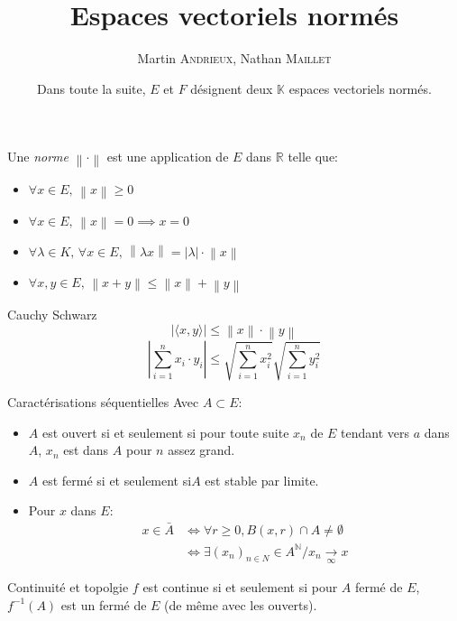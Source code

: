 \documentclass[french, a4paper, 11pt, twocolumn]{article}
\title{Espaces vectoriels normés}
\author{Martin \textsc{Andrieux}, Nathan \textsc{Maillet}}
\date{Dans toute la suite, \(E\) et \(F\) désignent deux \(\mathbb{K}\) espaces vectoriels normés.}
\newcommand{\ssi}{si et seulement si\xspace}		%
\newcommand{\norme}[1]{\left\| #1\right\|}
\newcommand{\abs}[1]{\left\lvert #1\right\rvert}
\newcommand{\limit}[1]{\underset{#1}{\rightarrow}}  %
\newcommand{\N}{\mathbb{N}}   %
\newcommand{\R}{\mathbb{R}}   %
\begin{document}
\maketitle

\begin{definition}
  Une \emph{norme} \(\norme{\cdot}\) est une application de \(E\) dans \(\R\) telle que:
  \begin{itemize}[label=\(\bullet\)]
    \item \(\forall x\in E,\,\norme{x}\geqslant 0\)
    \item \(\forall x\in E,\,\norme{x}=0\implies x=0\)
    \item \(\forall\lambda\in K,\,\forall x\in E,\, \norme{\lambda x}=\abs{\lambda} \cdot \norme{x}\)
    \item \(\forall x,y\in E,\, \norme{x+y}\leqslant\norme{x}+\norme{y}\)
  \end{itemize}
\end{definition}

\begin{theoreme}{Cauchy Schwarz}
  \[\left\lvert \langle x,y\rangle\right\rvert\leqslant\norme{x}\cdot\norme{y}\]
  \tcblower
  \[\abs{\sum_{i=1}^n x_{i}\cdot y_{i}}\leqslant \sqrt{\sum_{i=1}^n x_{i}^{2}}\sqrt{\sum_{i=1}^n y_{i}^{2}}\]
\end{theoreme}

\begin{theoreme}{Caractérisations séquentielles}
    Avec \(A \subset E\):
    \begin{itemize}[label=\(\bullet\)]
        \item \(A\) est ouvert \ssi pour toute suite \(x_{n}\) de \(E\) tendant vers \(a\) dans \(A\), \(x_{n}\) est dans \(A\) pour \(n\) assez grand.
        \item \(A\) est fermé \ssi \(A\) est stable par limite.
        \item Pour \(x\) dans \(E\):
        \begin{align*} 
            x \in \bar{A} & \iff \forall r \geq 0, B(x,r) \cap A \neq \emptyset \\
                          & \iff \exists {(x_n)}_{n\in N} \in A^{\N} / x_n \limit{\infty} x
        \end{align*}
    \end{itemize}
\end{theoreme}

\begin{theoreme}{Continuité et topolgie}
    \(f\) est continue \ssi pour \(A\) fermé de \(E\), \(f^{-1}(A)\) est un fermé de \(E\) (de même avec les ouverts).
\end{theoreme}
\end{document}
